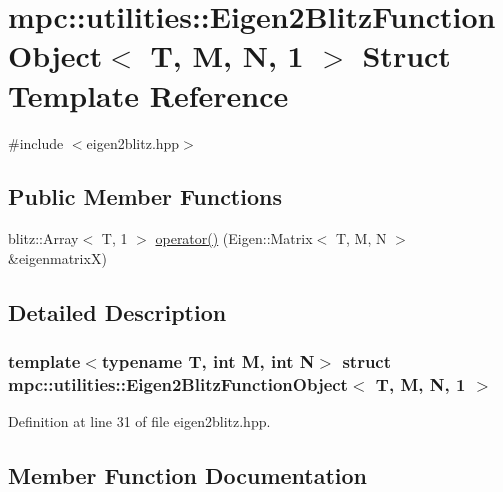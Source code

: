\hypertarget{structmpc_1_1utilities_1_1_eigen2_blitz_function_object_3_01_t_00_01_m_00_01_n_00_011_01_4}{}\section{mpc\+:\+:utilities\+:\+:Eigen2\+Blitz\+Function\+Object$<$ T, M, N, 1 $>$ Struct Template Reference}
\label{structmpc_1_1utilities_1_1_eigen2_blitz_function_object_3_01_t_00_01_m_00_01_n_00_011_01_4}


{\ttfamily \#include $<$eigen2blitz.\+hpp$>$}

\subsection*{Public Member Functions}
\begin{DoxyCompactItemize}
\item 
blitz\+::\+Array$<$ T, 1 $>$ \mbox{\hyperlink{structmpc_1_1utilities_1_1_eigen2_blitz_function_object_3_01_t_00_01_m_00_01_n_00_011_01_4_a74b35a2a352c947223205bf401c6a662}{operator()}} (Eigen\+::\+Matrix$<$ T, M, N $>$ \&eigenmatrixX)
\end{DoxyCompactItemize}


\subsection{Detailed Description}
\subsubsection*{template$<$typename T, int M, int N$>$\newline
struct mpc\+::utilities\+::\+Eigen2\+Blitz\+Function\+Object$<$ T, M, N, 1 $>$}



Definition at line 31 of file eigen2blitz.\+hpp.



\subsection{Member Function Documentation}
\mbox{\label{structmpc_1_1utilities_1_1_eigen2_blitz_function_object_3_01_t_00_01_m_00_01_n_00_011_01_4_a74b35a2a352c947223205bf401c6a662}} 
